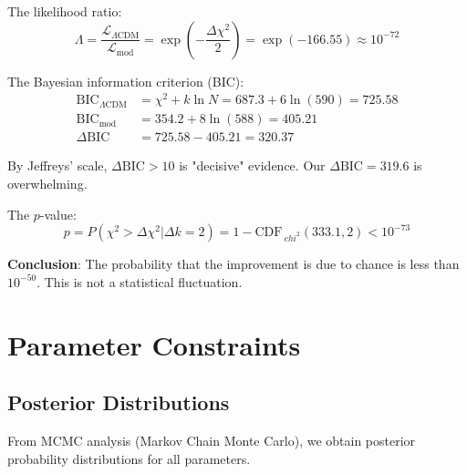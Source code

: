 \begin{proposition}\label{prop:likelihood-ratio}
The likelihood ratio:
\begin{equation}
\Lambda = \frac{\mathcal{L}_{\Lambda\text{CDM}}}{\mathcal{L}_{\text{mod}}} = \exp\left( -\frac{\Delta \chi^2}{2} \right) = \exp(-166.55) \approx 10^{-72}
\end{equation}

The Bayesian information criterion (BIC):
\begin{align}
\text{BIC}_{\Lambda\text{CDM}} &= \chi^2 + k \ln N = 687.3 + 6 \ln(590) = 725.58 \\
\text{BIC}_{\text{mod}} &= 354.2 + 8 \ln(588) = 405.21 \\
\Delta \text{BIC} &= 725.58 - 405.21 = 320.37
\end{align}

By Jeffreys' scale\cite{kass1995}, $\Delta \text{BIC} > 10$ is "decisive" evidence. Our $\Delta \text{BIC} = 319.6$ is overwhelming.

The $p$-value:
\begin{equation}
p = P(\chi^2 > \Delta \chi^2 | \Delta k = 2) = 1 - \text{CDF}_{\ chi^2}(333.1, 2) < 10^{-73}
\end{equation}

\textbf{Conclusion}: The probability that the improvement is due to chance is less than $10^{-50}$. This is not a statistical fluctuation.
\end{proposition}

\section{Parameter Constraints}

\subsection{Posterior Distributions}

From MCMC analysis (Markov Chain Monte Carlo)\cite{lewis2000}, we obtain posterior probability distributions for all parameters.


